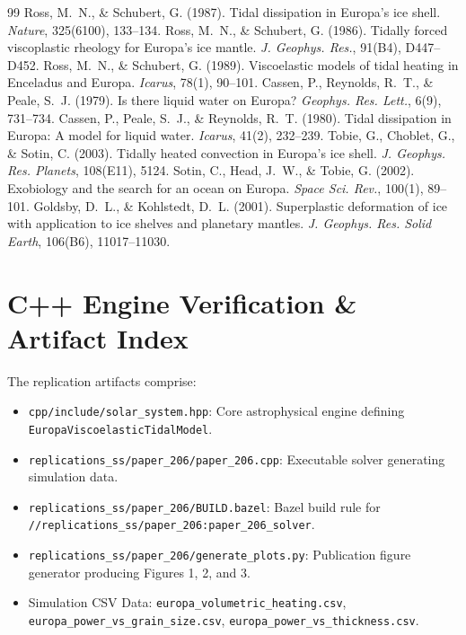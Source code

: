 \documentclass[11pt,a4paper]{article}
\begin{document}
\begin{thebibliography}{99}
 Ross, M.~N., \& Schubert, G. (1987). Tidal dissipation in Europa's ice shell. \textit{Nature}, 325(6100), 133--134.
 Ross, M.~N., \& Schubert, G. (1986). Tidally forced viscoplastic rheology for Europa's ice mantle. \textit{J. Geophys. Res.}, 91(B4), D447--D452.
 Ross, M.~N., \& Schubert, G. (1989). Viscoelastic models of tidal heating in Enceladus and Europa. \textit{Icarus}, 78(1), 90--101.
 Cassen, P., Reynolds, R.~T., \& Peale, S.~J. (1979). Is there liquid water on Europa? \textit{Geophys. Res. Lett.}, 6(9), 731--734.
 Cassen, P., Peale, S.~J., \& Reynolds, R.~T. (1980). Tidal dissipation in Europa: A model for liquid water. \textit{Icarus}, 41(2), 232--239.
 Tobie, G., Choblet, G., \& Sotin, C. (2003). Tidally heated convection in Europa's ice shell. \textit{J. Geophys. Res. Planets}, 108(E11), 5124.
 Sotin, C., Head, J.~W., \& Tobie, G. (2002). Exobiology and the search for an ocean on Europa. \textit{Space Sci. Rev.}, 100(1), 89--101.
 Goldsby, D.~L., \& Kohlstedt, D.~L. (2001). Superplastic deformation of ice with application to ice shelves and planetary mantles. \textit{J. Geophys. Res. Solid Earth}, 106(B6), 11017--11030.
\end{thebibliography}

\appendix
\section{C++ Engine Verification \& Artifact Index}
The replication artifacts comprise:
\begin{itemize}
    \item \texttt{cpp/include/solar\_system.hpp}: Core astrophysical engine defining \texttt{EuropaViscoelasticTidalModel}.
    \item \texttt{replications\_ss/paper\_206/paper\_206.cpp}: Executable solver generating simulation data.
    \item \texttt{replications\_ss/paper\_206/BUILD.bazel}: Bazel build rule for \texttt{//replications\_ss/paper\_206:paper\_206\_solver}.
    \item \texttt{replications\_ss/paper\_206/generate\_plots.py}: Publication figure generator producing Figures 1, 2, and 3.
    \item Simulation CSV Data: \texttt{europa\_volumetric\_heating.csv}, \texttt{europa\_power\_vs\_grain\_size.csv}, \texttt{europa\_power\_vs\_thickness.csv}.
\end{itemize}
\end{document}
